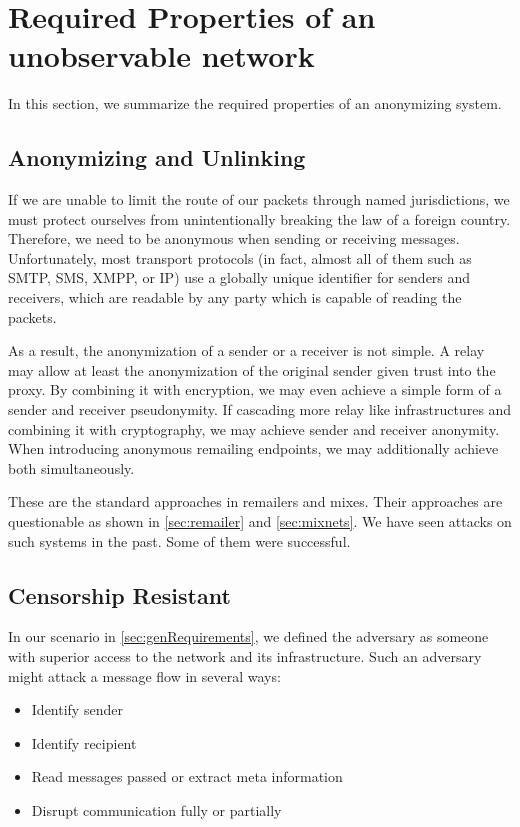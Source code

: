 \section{Required Properties of an unobservable network}
In this section, we summarize the required properties of an anonymizing system.

\subsection{Anonymizing and Unlinking}
If we are unable to limit the route of our packets through named jurisdictions, we must protect ourselves from unintentionally breaking the law of a foreign country. Therefore, we need to be anonymous when sending or receiving messages. Unfortunately, most transport protocols (in fact, almost all of them such as SMTP, SMS, XMPP, or IP) use a globally unique identifier for senders and receivers, which are readable by any party which is capable of reading the packets. 

As a result, the anonymization of a sender or a receiver is not simple. A relay may allow at least the anonymization of the original sender given trust into the proxy. By combining it with encryption, we may even achieve a simple form of a sender and receiver pseudonymity. If cascading more relay like infrastructures and combining it with cryptography, we may achieve sender and receiver anonymity. When introducing anonymous remailing endpoints, we may additionally achieve both simultaneously.

These are the standard approaches in remailers and mixes. Their approaches are questionable as shown in \ref{sec:remailer} and \ref{sec:mixnets}. We have seen attacks on such systems in the past. Some of them were successful.

\subsection{Censorship Resistant}
In our scenario in \ref{sec:genRequirements}, we defined the adversary as someone with superior access to the network and its infrastructure. Such an adversary might attack a message flow in several ways:
\begin{itemize}
	\item Identify sender
	\item Identify recipient
	\item Read messages passed or extract meta information
	\item Disrupt communication fully or partially
\end{itemize}

